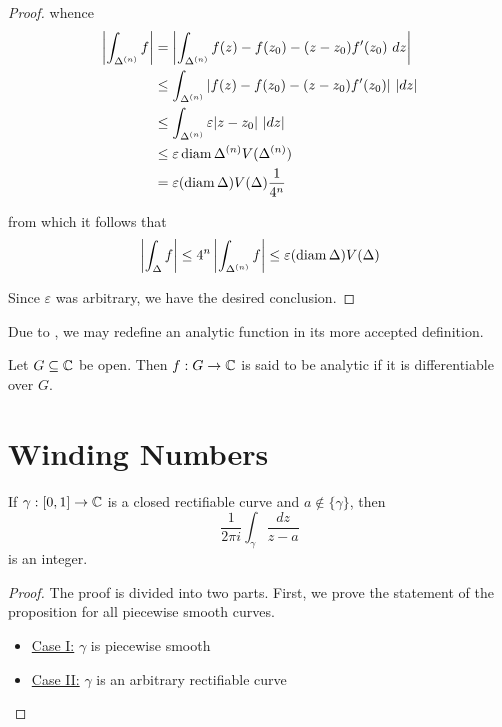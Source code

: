 \begin{proof}
    whence 
    \begin{align*}
        \left|\int_{\Delta^{(n)}} f\right| &= \left|\int_{\Delta^{(n)}} f(z) - f(z_0) - (z - z_0)f'(z_0)~dz\right|\\
        &\le\int_{\Delta^{(n)}}|f(z) - f(z_0) - (z - z_0)f'(z_0)|~|dz|\\
        &\le\int_{\Delta^{(n)}}\varepsilon|z - z_0|~|dz|\\
        &\le\varepsilon\operatorname{diam}\Delta^{(n)}V(\Delta^{(n)})\\
        &=\varepsilon(\operatorname{diam}\Delta) V(\Delta)\frac{1}{4^n}
    \end{align*}

    from which it follows that 
    \begin{equation*}
        \left|\int_{\Delta} f\right|\le 4^n\left|\int_{\Delta^{(n)}}f\right|\le\varepsilon(\operatorname{diam}\Delta) V(\Delta)
    \end{equation*}

    Since $\varepsilon$ was arbitrary, we have the desired conclusion.
\end{proof}

Due to , we may redefine an analytic function in its more accepted definition.
\begin{definition}[Analytic]
    Let $G\subseteq\mathbb{C}$ be open. Then $f: G\to\mathbb{C}$ is said to be analytic if it is differentiable over $G$.
\end{definition}

\section{Winding Numbers}

\begin{proposition}
    If $\gamma: [0,1]\to\mathbb{C}$ is a closed rectifiable curve and $a\notin\{\gamma\}$, then 
    \begin{equation*}
        \frac{1}{2\pi i}\int_{\gamma}\frac{dz}{z - a}
    \end{equation*}
    is an integer.
\end{proposition}
\begin{proof}
The proof is divided into two parts. First, we prove the statement of the proposition for all piecewise smooth curves. 

\begin{itemize}
\item \underline{Case I:} $\gamma$ is piecewise smooth\newline

\item \underline{Case II:} $\gamma$ is an arbitrary rectifiable curve
\end{itemize}
\end{proof}

